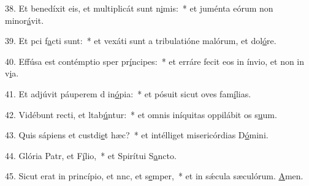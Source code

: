 38. Et benedíxit eis, et multiplicát sunt n\uline{i}mis:~* et juménta eórum non minor\uline{á}vit.\par 
39. Et pci f\uline{a}cti sunt:~* et vexáti sunt a tribulatióne malórum, et dol\uline{ó}re.\par 
40. Effúsa est contémptio sper pr\uline{í}ncipes:~* et erráre fecit eos in ínvio, et non in v\uline{i}a.\par 
41. Et adjúvit páuperem d in\uline{ó}pia:~* et pósuit sicut oves fam\uline{í}lias.\par 
42. Vidébunt recti, et ltab\uline{ú}ntur:~* et omnis iníquitas oppilábit os s\uline{u}um.\par 
43. Quis sápiens et custdi\uline{e}t hæc?~* et intélliget misericórdias D\uline{ó}mini.\par 
44. Glória Patr, et F\uline{í}lio,~* et Spirítui S\uline{a}ncto.\par 
45. Sicut erat in princípio, et nnc, et s\uline{e}mper,~* et in sǽcula sæculórum. \uline{A}men.\par 
